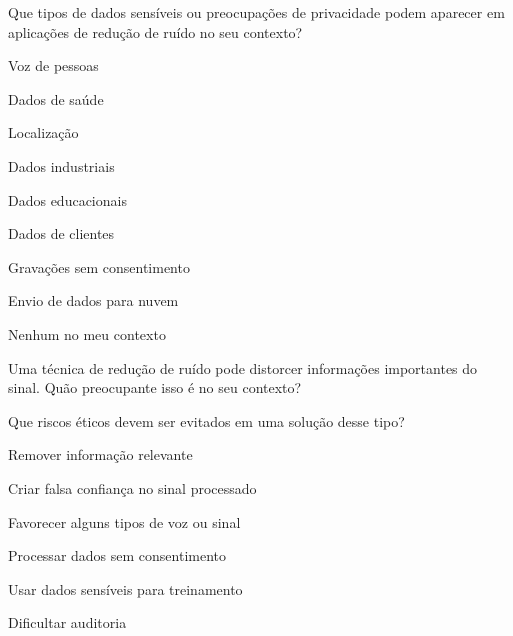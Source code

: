 \newpage


\begin{perguntaFormulario}{Que tipos de dados sensíveis ou preocupações de privacidade podem aparecer em aplicações de redução de ruído no seu contexto?}
\begin{opcoesFormularioDuasColunas}
    \item Voz de pessoas
    \item Dados de saúde
    \item Localização
    \item Dados industriais
    \item Dados educacionais
    \item Dados de clientes
    \item Gravações sem consentimento
    \item Envio de dados para nuvem
    \item Nenhum no meu contexto
\end{opcoesFormularioDuasColunas}
\end{perguntaFormulario}

\begin{perguntaFormulario}{Uma técnica de redução de ruído pode distorcer informações importantes do sinal. Quão preocupante isso é no seu contexto?}
\end{perguntaFormulario}

\begin{perguntaFormulario}{Que riscos éticos devem ser evitados em uma solução desse tipo?}
\begin{opcoesFormularioDuasColunas}
    \item Remover informação relevante
    \item Criar falsa confiança no sinal processado
    \item Favorecer alguns tipos de voz ou sinal
    \item Processar dados sem consentimento
    \item Usar dados sensíveis para treinamento
    \item Dificultar auditoria
\end{opcoesFormularioDuasColunas}
\end{perguntaFormulario}

